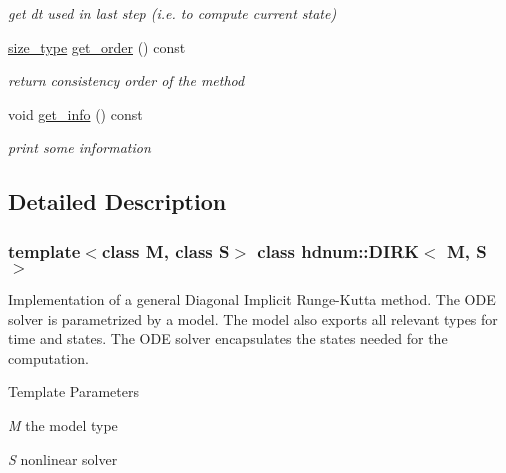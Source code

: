 \begin{DoxyCompactItemize}
\begin{DoxyCompactList}\small\item\em get dt used in last step (i.e. to compute current state) \item\end{DoxyCompactList}\item 
\hypertarget{classhdnum_1_1DIRK_aac3e58f4d2aba39e126fc26b4bc209c4}{
\hyperlink{classhdnum_1_1DIRK_a80ab2ad1360bc6061cea64d7a5ca9d12}{size\_\-type} \hyperlink{classhdnum_1_1DIRK_aac3e58f4d2aba39e126fc26b4bc209c4}{get\_\-order} () const }
\label{classhdnum_1_1DIRK_aac3e58f4d2aba39e126fc26b4bc209c4}

\begin{DoxyCompactList}\small\item\em return consistency order of the method \item\end{DoxyCompactList}\item 
\hypertarget{classhdnum_1_1DIRK_acea50784ed18f24bce76ad0c9a48a4d6}{
void \hyperlink{classhdnum_1_1DIRK_acea50784ed18f24bce76ad0c9a48a4d6}{get\_\-info} () const }
\label{classhdnum_1_1DIRK_acea50784ed18f24bce76ad0c9a48a4d6}

\begin{DoxyCompactList}\small\item\em print some information \item\end{DoxyCompactList}\end{DoxyCompactItemize}


\subsection{Detailed Description}
\subsubsection*{template$<$class M, class S$>$ class hdnum::DIRK$<$ M, S $>$}

Implementation of a general Diagonal Implicit Runge-\/Kutta method. The ODE solver is parametrized by a model. The model also exports all relevant types for time and states. The ODE solver encapsulates the states needed for the computation.


\begin{DoxyTemplParams}{Template Parameters}
\item[{\em M}]the model type \item[{\em S}]nonlinear solver \end{DoxyTemplParams}


